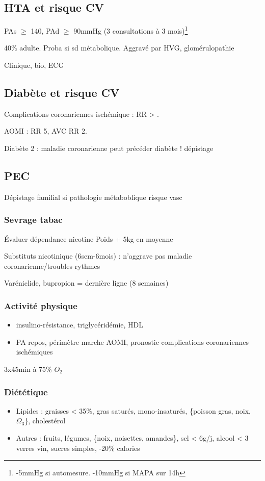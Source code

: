 \documentclass[11pt]{article}
\begin{document}
\subsection{HTA et risque CV}
\label{sec:org0c2491b}
PAs \(\ge\) 140, PAd \(\ge\) 90mmHg (3 consultations à 3 mois)\footnote{-5mmHg si automesure. -10mmHg si MAPA sur 14h}   

40\% adulte. Proba \inc si sd métabolique. Aggravé par \acrshort{HVG}, glomérulopathie

Clinique, bio, ECG

\subsection{Diabète et risque CV}
\label{sec:org07f3645}
Complications coronariennes ischémique : RR \female{} > \male.

AOMI : RR \texttimes{} 5, AVC RR \texttimes{} 2.

Diabète 2 : maladie coronarienne peut précéder diabète ! \thus dépistage

\subsection{PEC}
\label{sec:orgff04f0e}
Dépistage familial si pathologie métaboblique \inc risque vasc
\subsubsection{Sevrage tabac}
\label{sec:orge861de3}
Évaluer dépendance nicotine
Poids + 5kg en moyenne

Substituts nicotinique (6sem-6mois) : n'aggrave pas maladie
coronarienne/troubles rythmes

Varéniclide, bupropion = dernière ligne (8 semaines)
\subsubsection{Activité physique}
\label{sec:org5a15d65}
\begin{itemize}
\item \dec insulino-résistance, \dec triglycéridémie, \inc HDL
\item \dec PA repos, \inc périmètre marche AOMI, \inc pronostic complications coronariennes ischémiques
\end{itemize}

3x45min à 75\% \(O_2\)

\subsubsection{Diététique}
\label{sec:org31cf2d6}
\begin{itemize}
\item Lipides : graisses < 35\%, \dec gras saturés, \inc mono-insaturés, \{poisson gras, noix, \(\Omega_{\text{3}}\)\}, \dec cholestérol
\item Autres : \inc fruits, légumes, \{noix, noisettes, amandes\}, sel < 6g/j, alcool
< 3 verres vin, \dec sucres simples, -20\% calories
\end{itemize}
\end{document}
